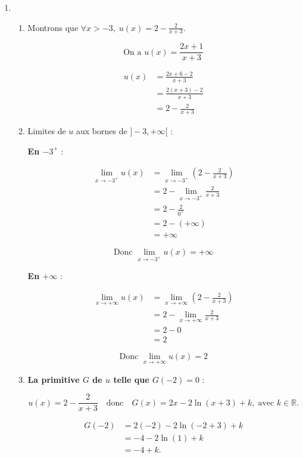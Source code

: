 \documentclass[12pt,a4paper]{article}
\begin{document}
\begin{enumerate}

\item
\begin{enumerate}
    \item Montrons que \( \forall x > -3, \; u(x) = 2 - \frac{2}{x+3} \).
    
    \[
    \text{On a } u(x) = \frac{2x+1}{x+3}
    \]

    \begin{align*}
        u(x) &= \frac{2x + 6 - 2}{x+3} \\
        &= \frac{2(x+3) - 2}{x+3} \\
        &= 2 - \frac{2}{x+3}
    \end{align*}

    \item Limites de \( u \) aux bornes de \( ]-3, +\infty[ \) :

    \textbf{En \( -3^+ \)} :
    
    \begin{align*}
    \lim_{x \to -3^+} u(x) &= \lim_{x \to -3^+} \left( 2 - \frac{2}{x+3} \right) \\
    &= 2 - \lim_{x \to -3^+} \frac{2}{x+3} \\
    &= 2 - \frac{2}{0^+} \\
    &= 2 - (+\infty) \\
    &= +\infty
    \end{align*}

    \[
    \text{Donc } \lim_{x \to -3^+} u(x) = +\infty
    \]

    \textbf{En \( +\infty \)} :
    
    \begin{align*}
    \lim_{x \to +\infty} u(x) &= \lim_{x \to +\infty} \left( 2 - \frac{2}{x+3} \right) \\
    &= 2 - \lim_{x \to +\infty} \frac{2}{x+3} \\
    &= 2 - 0 \\
    &= 2
    \end{align*}

    \[
    \text{Donc } \lim_{x \to +\infty} u(x) = 2
    \]

    \item \textbf{La primitive \( G \) de \( u \) telle que \( G(-2) = 0 \)} :
    
    \[
    u(x) = 2 - \frac{2}{x+3} \quad \text{donc} \quad G(x) = 2x - 2\ln(x+3) + k, \; \text{avec } k \in \mathbb{R}.
    \]

    \begin{align*}
    G(-2) &= 2(-2) - 2\ln(-2+3) + k \\
    &= -4 - 2\ln(1) + k \\
    &= -4 + k.
    \end{align*}


\end{enumerate}
\end{enumerate}
\end{document}
